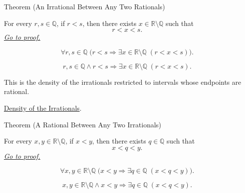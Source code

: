 \begin{theorembox}{Theorem (An Irrational Between Any Two Rationals)}
\begin{theorem}
\label{thm:irrational-between-any-two-rationals}
For every $r,s\in\mathbb{Q}$, if $r<s$, then there exists
$x\in\mathbb{R}\setminus\mathbb{Q}$ such that
\[
  r<x<s.
\]
\hyperref[prf:irrational-between-any-two-rationals]{\textit{Go to proof.}}
\end{theorem}
\end{theorembox}

\begin{remark*}
\[
\forall r,s\in\mathbb{Q}\;
\bigl(r<s\Longrightarrow
\exists x\in\mathbb{R}\setminus\mathbb{Q}\;(r<x<s)\bigr).
\]
\end{remark*}

\begin{remark*}
\[
r,s\in\mathbb{Q}\land r<s
\Longrightarrow \exists x\in\mathbb{R}\setminus\mathbb{Q}\;(r<x<s).
\]
\end{remark*}

\begin{remark*}[Interpretation]
This is the density of the irrationals restricted to intervals whose endpoints
are rational.
\end{remark*}

\begin{dependencies}
\hyperref[thm:density-of-irrationals-in-reals]{Density of the Irrationals}.
\end{dependencies}

\begin{theorembox}{Theorem (A Rational Between Any Two Irrationals)}
\begin{theorem}
\label{thm:rational-between-any-two-irrationals}
For every $x,y\in\mathbb{R}\setminus\mathbb{Q}$, if $x<y$, then there exists
$q\in\mathbb{Q}$ such that
\[
  x<q<y.
\]
\hyperref[prf:rational-between-any-two-irrationals]{\textit{Go to proof.}}
\end{theorem}
\end{theorembox}

\begin{remark*}
\[
\forall x,y\in\mathbb{R}\setminus\mathbb{Q}\;
\bigl(x<y\Longrightarrow \exists q\in\mathbb{Q}\;(x<q<y)\bigr).
\]
\end{remark*}

\begin{remark*}
\[
x,y\in\mathbb{R}\setminus\mathbb{Q}\land x<y
\Longrightarrow \exists q\in\mathbb{Q}\;(x<q<y).
\]
\end{remark*}

